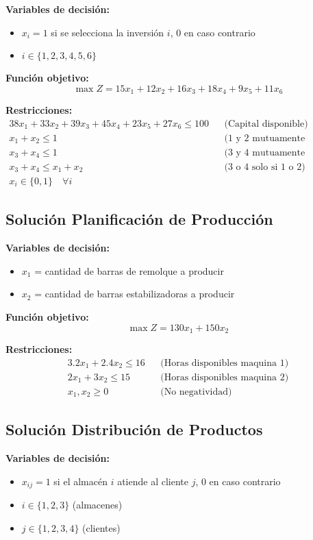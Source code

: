 \documentclass[12pt]{article}
\begin{document}
\textbf{Variables de decisión:}
\begin{itemize}
    \item $x_i = 1$ si se selecciona la inversión $i$, 0 en caso contrario
    \item $i \in \{1, 2, 3, 4, 5, 6\}$
\end{itemize}

\textbf{Función objetivo:}
$$\max Z = 15x_1 + 12x_2 + 16x_3 + 18x_4 + 9x_5 + 11x_6$$

\textbf{Restricciones:}
\begin{align*}
    38x_1 + 33x_2 + 39x_3 + 45x_4 + 23x_5 + 27x_6 \leq 100 && \text{(Capital disponible)} \\
    x_1 + x_2 \leq 1 && \text{(1 y 2 mutuamente excluyentes)} \\
    x_3 + x_4 \leq 1 && \text{(3 y 4 mutuamente excluyentes)} \\
    x_3 + x_4 \leq x_1 + x_2 && \text{(3 o 4 solo si 1 o 2)} \\
    x_i \in \{0,1\} \quad \forall i
\end{align*}

\subsection{Solución Planificación de Producción}

\textbf{Variables de decisión:}
\begin{itemize}
    \item $x_1$ = cantidad de barras de remolque a producir
    \item $x_2$ = cantidad de barras estabilizadoras a producir
\end{itemize}

\textbf{Función objetivo:}
$$\max Z = 130x_1 + 150x_2$$

\textbf{Restricciones:}
\begin{align*}
    3.2x_1 + 2.4x_2 \leq 16 && \text{(Horas disponibles maquina 1)} \\
    2x_1 + 3x_2 \leq 15 && \text{(Horas disponibles maquina 2)} \\
    x_1, x_2 \geq 0 && \text{(No negatividad)}
\end{align*}

\subsection{Solución Distribución de Productos}

\textbf{Variables de decisión:}
\begin{itemize}
    \item $x_{ij} = 1$ si el almacén $i$ atiende al cliente $j$, 0 en caso contrario
    \item $i \in \{1, 2, 3\}$ (almacenes)
    \item $j \in \{1, 2, 3, 4\}$ (clientes)
\end{itemize}
\end{document}
